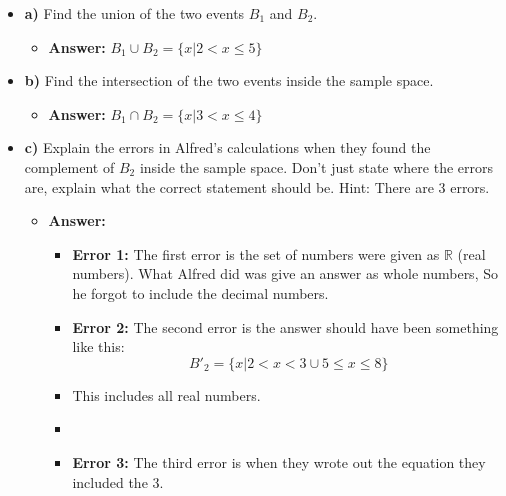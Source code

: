 \documentclass{article}
\begin{document}
\begin{itemize}  
    \item[] \textbf{a)} Find the union of the two events $B_1$ and $B_2$.
    \begin{itemize}
        \item[] \textbf{Answer:} $B_1 \cup B_2 = \{x | 2 < x \leq 5\}$
    \end{itemize}
    \item[] \textbf{b)} Find the intersection of the two events inside the sample space.
    \begin{itemize}
        \item[] \textbf{Answer:} $B_1 \cap B_2 = \{x | 3 < x \leq 4\}$
    \end{itemize}
    \item[] \textbf{c)} Explain the errors in Alfred's calculations when they found the complement of $B_2$
    inside the sample space. Don't just state where the errors are, explain what the 
    correct statement should be. Hint: There are 3 errors.
    \begin{itemize}
        \item[] \textbf{Answer:} 
        \begin{itemize}
            \item[] \textbf{Error 1:} The first error is the set of numbers were given as $\mathbb{R}$ (real numbers).
            What Alfred did was give an answer as whole numbers, So he forgot to include the decimal numbers.
            \item[] \textbf{Error 2:} The second error is the answer should have been  something like this:
            \[
            B'_2 = \{x| 2 < x < 3 \cup 5 \leq x \leq 8\}
            \]
            
            \item[] This includes all real numbers.
            \item[]            
            \item[] \textbf{Error 3:} The third error is when they wrote out the equation they included the $3$.
        \end{itemize}
    \end{itemize}
\end{itemize}
\newpage
\end{document}
